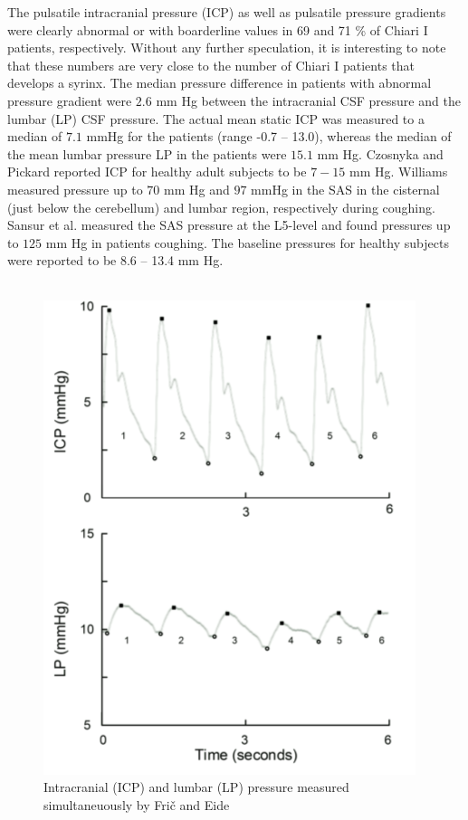 The pulsatile intracranial pressure (ICP) as well as pulsatile pressure gradients were clearly abnormal or with boarderline values in 69 and 71 \% of Chiari I patients, respectively. Without any further speculation, it is interesting to note that these numbers are very close to the number of Chiari I patients that develops a syrinx. The median pressure difference in patients with abnormal pressure gradient were $2.6$ mm Hg between the intracranial CSF pressure and the lumbar (LP) CSF pressure. The actual mean static ICP was measured to a median of $7.1$ mmHg for the patients (range -0.7 -- 13.0), whereas the median of the mean lumbar pressure LP in the patients were $15.1$ mm Hg. Czosnyka and Pickard \cite{Czos04} reported ICP for healthy adult subjects to be $7-15$ mm Hg. Williams \cite{Will76} measured pressure up to $70$ mm Hg and $97$ mmHg in the SAS in the cisternal (just below the cerebellum) and lumbar region, respectively during coughing. Sansur et al. \cite{Sans03} measured the SAS pressure at the L5-level and found pressures up to $125$ mm Hg in patients coughing. The baseline pressures for healthy subjects were reported to be 8.6 -- 13.4 mm Hg.  
\\
\\
\begin{center}
\begin{figure}[!ht]
\includegraphics[scale=0.5]{figures/ICP_and_LP}
\caption{Intracranial (ICP) and lumbar (LP) pressure measured simultaneuously by Fri{\v{c}} and Eide}\label{fig:ICP_and_LP}
\end{figure}
\end{center}

